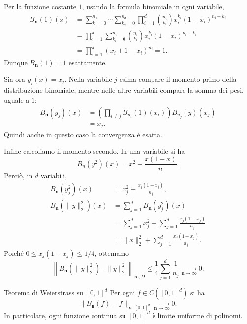\documentclass[a4paper]{article}
\begin{document}
\begin{snippetproof}{}
    Per la funzione costante \(1\), usando la formula binomiale in ogni variabile,
    \begin{align*}
        B_{\mathbf n}(1)(x)
        &=
        \sum_{k_1=0}^{n_1}\cdots\sum_{k_d=0}^{n_d}
        \prod_{i=1}^d \binom{n_i}{k_i}x_i^{k_i}(1-x_i)^{n_i-k_i}\\
        &=
        \prod_{i=1}^d \sum_{k_i=0}^{n_i}\binom{n_i}{k_i}x_i^{k_i}(1-x_i)^{n_i-k_i}\\
        &=
        \prod_{i=1}^d (x_i+1-x_i)^{n_i}=1.
    \end{align*}
    Dunque \(B_{\mathbf n}(1)=1\) esattamente.

    Sia ora \(y_j(x)=x_j\). Nella variabile \(j\)-esima compare il momento primo della distribuzione binomiale, mentre nelle altre variabili compare la somma dei pesi, uguale a \(1\):
    \begin{align*}
        B_{\mathbf n}(y_j)(x)
        &=
        \left(\prod_{i\neq j} B_{n_i}(1)(x_i)\right) B_{n_j}(y)(x_j)\\
        &=
        x_j.
    \end{align*}
    Quindi anche in questo caso la convergenza è esatta.

    Infine calcoliamo il momento secondo. In una variabile si ha
    \[
        B_n(y^2)(x)=x^2+\frac{x(1-x)}{n}.
    \]
    Perciò, in \(d\) variabili,
    \begin{align*}
        B_{\mathbf n}(y_j^2)(x)
        &=
        x_j^2+\frac{x_j(1-x_j)}{n_j},\\
        B_{\mathbf n}(\|y\|_2^2)(x)
        &=
        \sum_{j=1}^d B_{\mathbf n}(y_j^2)(x)\\
        &=
        \sum_{j=1}^d x_j^2+
        \sum_{j=1}^d \frac{x_j(1-x_j)}{n_j}\\
        &=
        \|x\|_2^2+
        \sum_{j=1}^d \frac{x_j(1-x_j)}{n_j}.
    \end{align*}
    Poiché \(0\leq x_j(1-x_j)\leq 1/4\), otteniamo
    \[
        \left\|B_{\mathbf n}(\|y\|_2^2)-\|y\|_2^2\right\|_{\infty,D}
        \leq
        \frac14\sum_{j=1}^d \frac1{n_j}
        \xrightarrow[\mathbf n\to\infty]{}0.
    \]
\end{snippetproof}

\begin{snippettheorem}{Teorema di Weierstrass su \([0,1]^d\)}
    Per ogni \(f\in C([0,1]^d)\) si ha
    \[
        \|B_{\mathbf n}(f)-f\|_{\infty,[0,1]^d}
        \xrightarrow[\mathbf n\to\infty]{}0.
    \]
    In particolare, ogni funzione continua su \([0,1]^d\) è limite uniforme di polinomi.
\end{snippettheorem}
\end{document}
